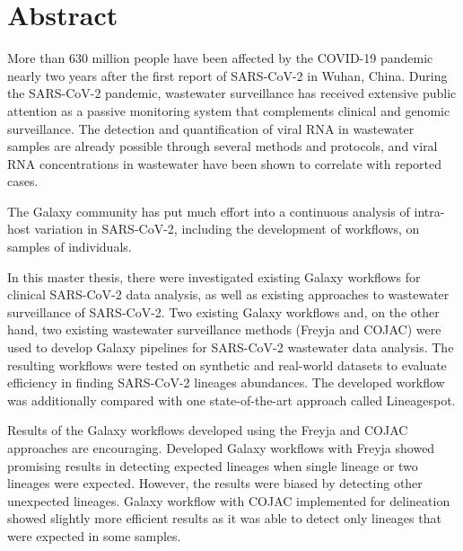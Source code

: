 %
\section*{Abstract}

More than 630 million people have been affected by the COVID-19 pandemic nearly two years after the first report of SARS-CoV-2 in Wuhan, China. During the SARS-CoV-2 pandemic, wastewater surveillance has received extensive public attention as a passive monitoring system that complements clinical and genomic surveillance. The detection and quantification of viral RNA in wastewater samples are already possible through several methods and protocols, and viral RNA concentrations in wastewater have been shown to correlate with reported cases.
    
The Galaxy community has put much effort into a continuous analysis of intra-host variation in SARS-CoV-2, including the development of workflows, on samples of individuals.
    
In this master thesis, there were investigated existing Galaxy workflows for clinical SARS-CoV-2 data analysis, as well as existing approaches to wastewater surveillance of SARS-CoV-2. Two existing Galaxy workflows and, on the other hand, two existing wastewater surveillance methods (Freyja and COJAC) were used to develop Galaxy pipelines for SARS-CoV-2 wastewater data analysis. The resulting workflows were tested on synthetic and real-world datasets to evaluate efficiency in finding SARS-CoV-2 lineages abundances. The developed workflow was additionally compared with one state-of-the-art approach called Lineagespot.

Results of the Galaxy workflows developed using the Freyja and COJAC approaches are encouraging. Developed Galaxy workflows with Freyja showed promising results in detecting expected lineages when single lineage or two lineages were expected. However, the results were biased by detecting other unexpected lineages. Galaxy workflow with COJAC implemented for delineation showed slightly more efficient results as it was able to detect only lineages that were expected in some samples.


